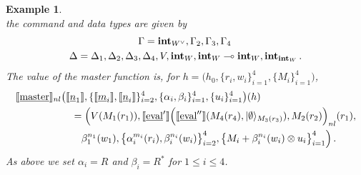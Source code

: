 \documentclass[english,letter paper,12pt,leqno]{article}
\theoremstyle{example}
\newtheorem{example}[theorem]{Example}
\newtheorem{remark}[theorem]{Remark}
\numberwithin{equation}{section}
\DeclareMathOperator{\End}{End}
\begin{document}
\begin{example}
\[\]
the command and data types are given by
\begin{gather*}
\Gamma = \textbf{int}_{W^{\vee}}, \Gamma_2, \Gamma_3, \Gamma_4\,\\
\Delta = \Delta_1, \Delta_2, \Delta_3, \Delta_4, V, \textbf{int}_W, \textbf{int}_W \multimap \textbf{int}_W, \textbf{int}_{\textbf{int}_W}\,.
\end{gather*}
The value of the master function is, for $h = \big(h_0, \{r_i, w_i\}_{i=1}^4, \{M_i\}_{i=1}^4\big)$,
\begin{align*}
\llbracket \underline{\textup{master}} \rrbracket_{nl}&\big( \llbracket \underline{n}_1 \rrbracket, \{\llbracket \underline{m}_i \rrbracket, \llbracket \underline{n}_i \rrbracket\}_{i=2}^4, \{\alpha_i, \beta_i\}_{i=1}^4, \{u_i\}_{i=1}^4\big)(h)\\
&\quad = \Big(V(M_1(r_1)), \llbracket \underline{\mathrm{eval}}' \rrbracket\Big( \llbracket \underline{\mathrm{eval}}'' \rrbracket( M_4(r_4), \lvert\emptyset\rangle_{M_3(r_3)} ), M_2(r_2) \Big)_{nl}(r_1),\\
&\qquad \beta_1^{n_1}(w_1), \big\{\alpha_i^{m_i}(r_i), \beta_i^{n_i}(w_i)\big\}_{i=2}^4, \big\{M_i + \beta_i^{n_i}(w_i) \otimes u_i \big\}_{i=1}^4 \Big)\,.
\end{align*}
As above we set $\alpha_i = R$ and $\beta_i = R^*$ for $1 \le i \le 4$.
\end{example}


\end{document}
